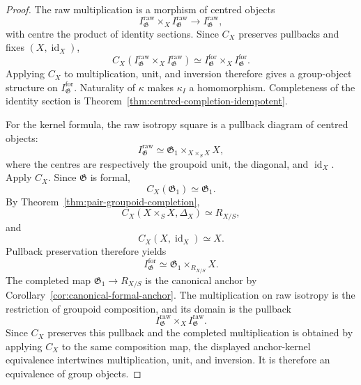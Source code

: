 \begin{proof}
The raw multiplication is a morphism of centred objects
\[
    I^{\mathrm{raw}}_{\mathfrak G}
    \times_X
    I^{\mathrm{raw}}_{\mathfrak G}
    \longrightarrow
    I^{\mathrm{raw}}_{\mathfrak G},
\]
with centre the product of identity sections.  Since $C_X$ preserves pullbacks and fixes
$(X,\operatorname{id}_X)$,
\[
    C_X
    \left(
        I^{\mathrm{raw}}_{\mathfrak G}
        \times_X
        I^{\mathrm{raw}}_{\mathfrak G}
    \right)
    \simeq
    I^{\mathrm{for}}_{\mathfrak G}
    \times_X
    I^{\mathrm{for}}_{\mathfrak G}.
\]
Applying $C_X$ to multiplication, unit, and inversion therefore gives a
group-object structure on $I^{\mathrm{for}}_{\mathfrak G}$.  Naturality of
$\kappa$ makes $\kappa_I$ a homomorphism.  Completeness of the identity
section is Theorem~\ref{thm:centred-completion-idempotent}.

For the kernel formula, the raw isotropy square is a pullback diagram of
centred objects:
\[
    I^{\mathrm{raw}}_{\mathfrak G}
    \simeq
    \mathfrak G_1
    \times_{X\times_SX}
    X,
\]
where the centres are respectively the groupoid unit, the diagonal, and
$\operatorname{id}_X$.  Apply $C_X$.  Since $\mathfrak G$ is formal,
\[
    C_X(\mathfrak G_1)\simeq\mathfrak G_1.
\]
By Theorem~\ref{thm:pair-groupoid-completion},
\[
    C_X(X\times_SX,\Delta_X)\simeq R_{X/S},
\]
and
\[
    C_X(X,\operatorname{id}_X)\simeq X.
\]
Pullback preservation therefore yields
\[
    I^{\mathrm{for}}_{\mathfrak G}
    \simeq
    \mathfrak G_1\times_{R_{X/S}}X.
\]
The completed map $\mathfrak G_1\to R_{X/S}$ is the canonical anchor by
Corollary~\ref{cor:canonical-formal-anchor}.  The multiplication on raw
isotropy is the restriction of groupoid composition, and its domain is the
pullback
\[
    I^{\mathrm{raw}}_{\mathfrak G}
    \times_X
    I^{\mathrm{raw}}_{\mathfrak G}.
\]
Since $C_X$ preserves this pullback and the completed multiplication is
obtained by applying $C_X$ to the same composition map, the displayed
anchor-kernel equivalence intertwines multiplication, unit, and inversion.
It is therefore an equivalence of group objects.
\end{proof}

